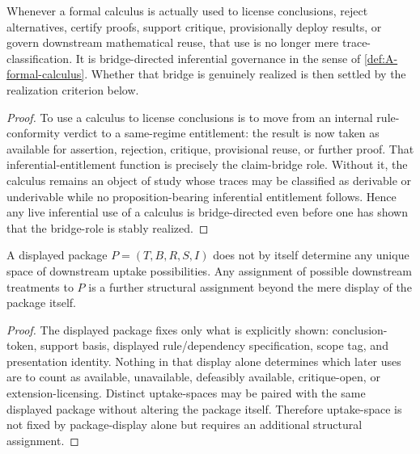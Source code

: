 \begin{lemma}
\label{lem:A-bridge-dependent}
Whenever a formal calculus is actually used to license conclusions, reject alternatives, certify proofs, support critique, provisionally deploy results, or govern downstream mathematical reuse, that use is no longer mere trace-classification. It is bridge-directed inferential governance in the sense of \cref{def:A-formal-calculus}. Whether that bridge is genuinely realized is then settled by the realization criterion below.
\end{lemma}

\begin{proof}
To use a calculus to license conclusions is to move from an internal rule-conformity verdict to a same-regime entitlement: the result is now taken as available for assertion, rejection, critique, provisional reuse, or further proof. That inferential-entitlement function is precisely the claim-bridge role. Without it, the calculus remains an object of study whose traces may be classified as derivable or underivable while no proposition-bearing inferential entitlement follows. Hence any live inferential use of a calculus is bridge-directed even before one has shown that the bridge-role is stably realized.
\end{proof}

\begin{theorem}
\label{thm:A-package-not-uptake}
A displayed package $P=(T,B,R,S,I)$ does not by itself determine any unique space of downstream uptake possibilities. Any assignment of possible downstream treatments to $P$ is a further structural assignment beyond the mere display of the package itself.
\end{theorem}

\begin{proof}
The displayed package fixes only what is explicitly shown: conclusion-token, support basis, displayed rule/dependency specification, scope tag, and presentation identity. Nothing in that display alone determines which later uses are to count as available, unavailable, defeasibly available, critique-open, or extension-licensing. Distinct uptake-spaces may be paired with the same displayed package without altering the package itself. Therefore uptake-space is not fixed by package-display alone but requires an additional structural assignment.
\end{proof}

